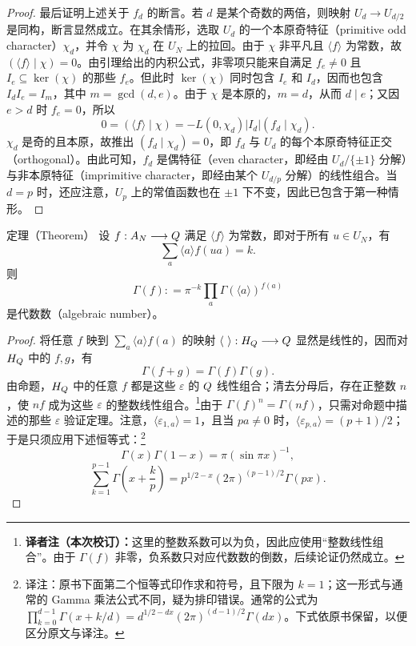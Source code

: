 \begin{proof}
最后证明上述关于 $f_d$ 的断言。若 $d$ 是某个奇数的两倍，则映射 $U_d\longrightarrow U_{d/2}$ 是同构，断言显然成立。在其余情形，选取 $U_d$ 的一个本原奇特征（primitive odd character）$\chi_d$，并令 $\chi$ 为 $\chi_d$ 在 $U_N$ 上的拉回。由于 $\chi$ 非平凡且 $\langle f\rangle$ 为常数，故
$(\langle f\rangle\mid\chi)=0$。由引理给出的内积公式，非零项只能来自满足 $f_e\ne0$ 且 $I_e\subseteq\ker(\chi)$ 的那些 $f_e$。但此时 $\ker(\chi)$ 同时包含 $I_e$ 和 $I_d$，因而也包含 $I_dI_e=I_m$，其中 $m=\gcd(d,e)$。由于 $\chi$ 是本原的，$m=d$，从而 $d\mid e$；又因 $e>d$ 时 $f_e=0$，所以
\[
 0=(\langle f\rangle\mid\chi)
   =-L(0,\chi_d)|I_d|(f_d\mid\chi_d).
\]
$\chi_d$ 是奇的且本原，故推出 $(f_d\mid\chi_d)=0$，即 $f_d$ 与 $U_d$ 的每个本原奇特征正交（orthogonal）。由此可知，$f_d$ 是偶特征（even character，即经由 $U_d/\{\pm1\}$ 分解）与非本原特征（imprimitive character，即经由某个 $U_{d/p}$ 分解）的线性组合。当 $d=p$ 时，还应注意，$U_p$ 上的常值函数也在 $\pm1$ 下不变，因此已包含于第一种情形。
\end{proof}

\begin{originaltheorem}{定理（Theorem）}
设 $f:A_N\longrightarrow Q$ 满足 $\langle f\rangle$ 为常数，即对于所有 $u\in U_N$，有
\[
 \sum_a\langle a\rangle f(ua)=k.
\]
则
\[
 \Gamma(f)\mathrel{\mathop:}=\pi^{-k}\prod_a\Gamma(\langle a\rangle)^{f(a)}
\]
是代数数（algebraic number）。
\end{originaltheorem}
\begin{proof}
将任意 $f$ 映到 $\sum_a\langle a\rangle f(a)$ 的映射
$\langle\ \rangle:H_{\Q}\longrightarrow\Q$ 显然是线性的，因而对 $H_{Q}$ 中的 $f,g$，有
\[
 \Gamma(f+g)=\Gamma(f)\Gamma(g).
\]
由命题，$H_{Q}$ 中的任意 $f$ 都是这些 $\varepsilon$ 的 $Q$ 线性组合；清去分母后，存在正整数 $n$，使 $nf$ 成为这些 $\varepsilon$ 的整数线性组合。\footnote{\textbf{译者注（本次校订）：}这里的整数系数可以为负，因此应使用“整数线性组合”。由于 $\Gamma(f)$ 非零，负系数只对应代数数的倒数，后续论证仍然成立。}由于 $\Gamma(f)^n=\Gamma(nf)$，只需对命题中描述的那些 $\varepsilon$ 验证定理。注意，$\langle\varepsilon_{1,a}\rangle=1$，且当 $pa\ne0$ 时，$\langle\varepsilon_{p,a}\rangle=(p+1)/2$；于是只须应用下述恒等式：\footnote{译注：原书下面第二个恒等式印作求和符号，且下限为 $k=1$；这一形式与通常的 Gamma 乘法公式不同，疑为排印错误。通常的公式为 $\prod_{k=0}^{d-1}\Gamma(x+k/d)=d^{1/2-dx}(2\pi)^{(d-1)/2}\Gamma(dx)$。下式依原书保留，以便区分原文与译注。}
\[
 \Gamma(x)\Gamma(1-x)=\pi(\sin\pi x)^{-1},
\]
\[
 \sum_{k=1}^{p-1}\Gamma\left(x+\frac{k}{p}\right)
 =p^{1/2-x}(2\pi)^{(p-1)/2}\Gamma(px).
\]
\end{proof}

